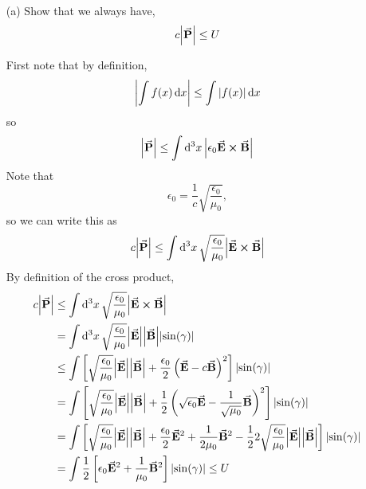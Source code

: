 \documentclass[a4paper,twoside]{article}
\begin{document}
\begin{itemize}
    \item[(a)] Show that we always have,
        \begin{equation}
            c \abs{ \va{P}} \leq U
        \end{equation}
        \begin{problem}
            First note that by definition,
            \begin{equation}
                \abs{\int f(x) \dd{x}} \leq \int \abs{f(x)} \dd{x}
            \end{equation}
            so
            \begin{equation}
                \abs{ \va{P}} \leq \int \dd[3]{x} \abs{\epsilon_0 \va{E} \cross \va{B}}
            \end{equation}
            Note that
            \begin{equation}
                \epsilon_0 = \frac{1}{c} \sqrt{\frac{\epsilon_0}{\mu_0}},
            \end{equation}
            so we can write this as
            \begin{equation}
                c \abs{ \va{P}} \leq \int \dd[3]{x} \sqrt{\frac{\epsilon_0}{\mu_0}} \abs{ \va{E} \cross \va{B}}
            \end{equation}
            By definition of the cross product,
            \begin{align}
                c \abs{ \va{P}} &\leq \int \dd[3]{x} \sqrt{\frac{\epsilon_0}{\mu_0}} \abs{ \va{E} \cross \va{B}} \\
                &= \int \dd[3]{x} \sqrt{\frac{\epsilon_0}{\mu_0}} \abs{ \va{E}} \abs{ \va{B}} \abs{\sin(\gamma)} \\
                &\leq \int \left[ \sqrt{\frac{\epsilon_0}{\mu_0}} \abs{ \va{E}} \abs{ \va{B}} + \frac{\epsilon_0}{2} \left( \va{E} - c \va{B} \right)^2  \right] \abs{\sin(\gamma)} \\ 
                &= \int \left[ \sqrt{\frac{\epsilon_0}{\mu_0}} \abs{ \va{E}} \abs{ \va{B}} + \frac{1}{2} \left( \sqrt{\epsilon_0} \va{E} - \frac{1}{\sqrt{\mu_0}}  \va{B} \right)^2  \right] \abs{\sin(\gamma)} \\
                &= \int \left[ \sqrt{\frac{\epsilon_0}{\mu_0}} \abs{ \va{E}} \abs{ \va{B}} + \frac{\epsilon_0}{2} \va{E}^2 + \frac{1}{2 \mu_0} \va{B}^2 - \frac{1}{2} 2 \sqrt{\frac{\epsilon_0}{\mu_0}} \abs{ \va{E}} \abs{ \va{B}} \right] \abs{\sin(\gamma)} \\
                &= \int \frac{1}{2} \left[ \epsilon_0 \va{E}^2 + \frac{1}{\mu_0} \va{B}^2 \right] \abs{\sin(\gamma)} \leq U

\end{align}
\end{problem}
\end{itemize}
\end{document}
